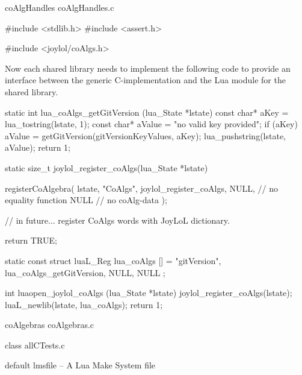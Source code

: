 \createCCodeFile%
  {coAlgHandles}%
  {coAlgHandles.c}%
  {}

\startCCode
#include <stdlib.h>
#include <assert.h>

#include <joylol/coAlgs.h>
\stopCCode

Now each shared library needs to implement the following code to provide 
an interface between the generic C-implementation and the Lua module for 
the shared library. 

\startCCode
static int lua_coAlgs_getGitVersion (lua_State *lstate) {
  const char* aKey   = lua_tostring(lstate, 1);
  const char* aValue = "no valid key provided";
  if (aKey) aValue = getGitVersion(gitVersionKeyValues, aKey);
  lua_pushstring(lstate, aValue);
  return 1;
}

static size_t joylol_register_coAlgs(lua_State *lstate) {
  registerCoAlgebra(
    lstate,
    "CoAlgs",
    joylol_register_coAlgs,
    NULL, // no equality function
    NULL  // no coAlg-data
  );
  
  // in future... register CoAlgs words with JoyLoL dictionary. 
  
  return TRUE;
}

static const struct luaL_Reg lua_coAlgs [] = {
  {"gitVersion", lua_coAlgs_getGitVersion},
  {NULL, NULL}
};

int luaopen_joylol_coAlgs (lua_State *lstate) {
  joylol_register_coAlgs(lstate);
  luaL_newlib(lstate, lua_coAlgs);
  return 1;
}
\stopCCode

\createCCodeFile%
  {coAlgebras}%
  {coAlgebras.c}%
  {}

\createCTestFile%
  {class}%
  {allCTests.c}%
  {}





\createLmsfileFile%
  {default}%
  {lmsfile}%
  {-- A Lua Make System file}

